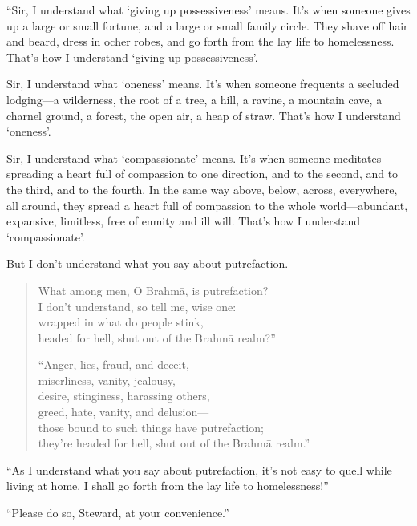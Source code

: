 \documentclass[12pt,openany]{book}%
\begin{document}
“Sir, I understand what ‘giving up possessiveness’ means. It’s when someone gives up a large or small fortune, and a large or small family circle. They shave off hair and beard, dress in ocher robes, and go forth from the lay life to homelessness. That’s how I understand ‘giving up possessiveness’. 

Sir, I understand what ‘oneness’ means. It’s when someone frequents a secluded lodging—a wilderness, the root of a tree, a hill, a ravine, a mountain cave, a charnel ground, a forest, the open air, a heap of straw. That’s how I understand ‘oneness’. 

Sir, I understand what ‘compassionate’ means. It’s when someone meditates spreading a heart full of compassion to one direction, and to the second, and to the third, and to the fourth. In the same way above, below, across, everywhere, all around, they spread a heart full of compassion to the whole world—abundant, expansive, limitless, free of enmity and ill will. That’s how I understand ‘compassionate’. 

But I don’t understand what you say about putrefaction. 

\begin{verse}%
What among men, O \textsanskrit{Brahmā}, is putrefaction? \\
I don’t understand, so tell me, wise one: \\
wrapped in what do people stink, \\
headed for hell, shut out of the \textsanskrit{Brahmā} realm?” 

“Anger, lies, fraud, and deceit, \\
miserliness, vanity, jealousy, \\
desire, stinginess, harassing others, \\
greed, hate, vanity, and delusion—\\
those bound to such things have putrefaction; \\
they’re headed for hell, shut out of the \textsanskrit{Brahmā} realm.” 

%
\end{verse}

“As I understand what you say about putrefaction, it’s not easy to quell while living at home. I shall go forth from the lay life to homelessness!” 

“Please do so, Steward, at your convenience.” 
\end{document}
